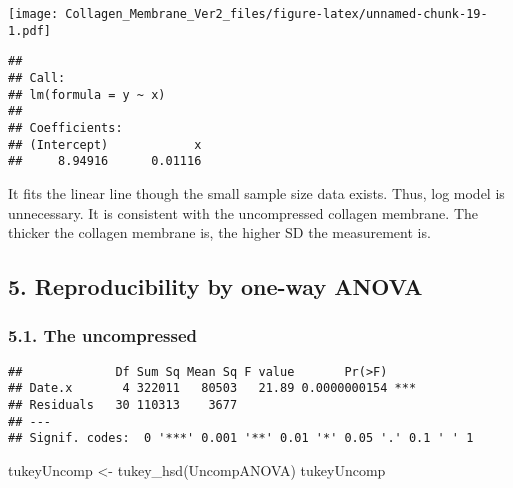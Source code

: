 \documentclass[
]{article}
\newenvironment{Shaded}{\begin{snugshade}}{\end{snugshade}}
\newcommand{\AttributeTok}[1]{\textcolor[rgb]{0.77,0.63,0.00}{#1}}
\newcommand{\CommentTok}[1]{\textcolor[rgb]{0.56,0.35,0.01}{\textit{#1}}}
\newcommand{\FunctionTok}[1]{\textcolor[rgb]{0.00,0.00,0.00}{#1}}
\newcommand{\NormalTok}[1]{#1}
\newcommand{\OtherTok}[1]{\textcolor[rgb]{0.56,0.35,0.01}{#1}}
\newcommand{\SpecialCharTok}[1]{\textcolor[rgb]{0.00,0.00,0.00}{#1}}
\newcommand{\StringTok}[1]{\textcolor[rgb]{0.31,0.60,0.02}{#1}}
\begin{document}
\texttt{[image: Collagen\_Membrane\_Ver2\_files/figure-latex/unnamed-chunk-19-1.pdf]}

\begin{verbatim}
## 
## Call:
## lm(formula = y ~ x)
## 
## Coefficients:
## (Intercept)            x  
##     8.94916      0.01116
\end{verbatim}

It fits the linear line though the small sample size data exists. Thus,
log model is unnecessary. It is consistent with the uncompressed
collagen membrane. The thicker the collagen membrane is, the higher SD
the measurement is.

\hypertarget{reproducibility-by-one-way-anova}{%
\subsection{5. Reproducibility by one-way
ANOVA}\label{reproducibility-by-one-way-anova}}

\hypertarget{the-uncompressed-3}{%
\subsubsection{5.1. The uncompressed}\label{the-uncompressed-3}}

\begin{Shaded}
\end{Shaded}

\begin{verbatim}
##             Df Sum Sq Mean Sq F value       Pr(>F)    
## Date.x       4 322011   80503   21.89 0.0000000154 ***
## Residuals   30 110313    3677                         
## ---
## Signif. codes:  0 '***' 0.001 '**' 0.01 '*' 0.05 '.' 0.1 ' ' 1
\end{verbatim}

\begin{Shaded}
\begin{Highlighting}[]
\NormalTok{tukeyUncomp }\OtherTok{\textless{}{-}} \FunctionTok{tukey\_hsd}\NormalTok{(UncompANOVA)}
\NormalTok{tukeyUncomp}
\end{Highlighting}
\end{Shaded}
\end{document}
